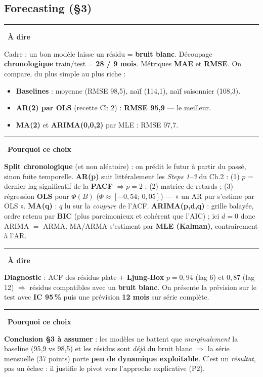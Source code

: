 \documentclass[11pt,a4paper]{article}
\newenvironment{say}{\par\medskip\noindent\textcolor{blue!45!black}{\rule[-1pt]{3pt}{12pt}}\
  \textbf{\textcolor{blue!45!black}{À dire}}\par\nopagebreak\smallskip\noindent\ignorespaces}{\par\medskip}
\newenvironment{why}{\par\medskip\noindent\textcolor{orange!60!black}{\rule[-1pt]{3pt}{12pt}}\
  \textbf{\textcolor{orange!60!black}{Pourquoi ce choix}}\par\nopagebreak\smallskip\noindent\ignorespaces}{\par\medskip}
\begin{document}
\subsection{Forecasting (\S3)}
\begin{say}
Cadre : un bon modèle laisse un résidu = \textbf{bruit blanc}. Découpage \textbf{chronologique}
train/test = \textbf{28 / 9 mois}. Métriques \textbf{MAE} et \textbf{RMSE}. On compare, du plus
simple au plus riche :
\begin{itemize}[nosep]
  \item \textbf{Baselines} : moyenne (RMSE 98{,}5), naïf (114{,}1), naïf saisonnier (108{,}3).
  \item \textbf{AR(2) par OLS} (recette Ch.2) : \textbf{RMSE 95{,}9} --- le meilleur.
  \item \textbf{MA(2)} et \textbf{ARIMA(0,0,2)} par MLE : RMSE 97{,}7.
\end{itemize}
\end{say}
\begin{why}
\textbf{Split chronologique} (et non aléatoire) : on prédit le futur à partir du passé, sinon
fuite temporelle. \textbf{AR(p)} suit littéralement les \emph{Steps 1--3} du Ch.2 : (1) $p$ = dernier
lag significatif de la \textbf{PACF} $\Rightarrow p=2$ ; (2) matrice de retards ; (3) régression
\textbf{OLS} pour $\Phi(B)$ ($\Phi\approx[-0{,}54;\ 0{,}05]$) --- « un AR pur s'estime par OLS ».
\textbf{MA(q)} : $q$ lu sur la \emph{coupure} de l'ACF. \textbf{ARIMA(p,d,q)} : grille balayée,
ordre retenu par \textbf{BIC} (plus parcimonieux et cohérent que l'AIC) ; ici $d=0$ donc ARIMA
$=$ ARMA. MA/ARMA s'estiment par \textbf{MLE (Kalman)}, contrairement à l'AR.
\end{why}
\begin{say}
\textbf{Diagnostic} : ACF des résidus plate + \textbf{Ljung-Box} $p=0{,}94$ (lag 6) et $0{,}87$
(lag 12) $\Rightarrow$ résidus compatibles avec un \textbf{bruit blanc}. On présente la prévision
sur le test avec \textbf{IC 95\,\%} puis une prévision \textbf{12 mois} sur série complète.
\end{say}
\begin{why}
\textbf{Conclusion \S3 à assumer} : les modèles ne battent que \emph{marginalement} la baseline
(95{,}9 vs 98{,}5) et les résidus sont \emph{déjà} du bruit blanc $\Rightarrow$ la série mensuelle
(37 points) porte \textbf{peu de dynamique exploitable}. C'est un \emph{résultat}, pas un échec :
il justifie le pivot vers l'approche explicative (P2).
\end{why}
\end{document}
